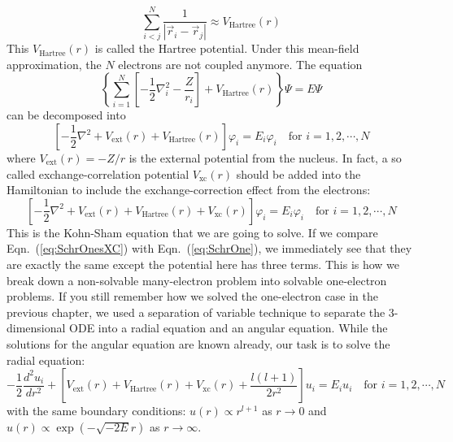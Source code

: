 \begin{equation} \label{eq:Hartree}
\sum_{i<j}^N \frac{1}{|\vec{r}_i - \vec{r}_j|} \approx  V_{\text{Hartree}}(r)
\end{equation}
%
This $V_{\text{Hartree}}(r)$ is called the Hartree potential. Under this mean-field
approximation, the $N$ electrons are not coupled anymore. The equation
\begin{equation} \label{eq:SchrDecp}
\left\{\sum_{i=1}^N \left[ -\frac{1}{2} \nabla_i^2 - \frac{Z}{r_i} \right] + V_{\text{Hartree}}(r)\right\} \Psi = E \Psi
\end{equation}
can be decomposed into
\begin{equation} \label{eq:SchrOnes}
\left[ -\frac{1}{2} \nabla^2 + V_{\text{ext}}(r) +  V_{\text{Hartree}}(r) \right] \varphi_i = E_i \varphi_i \quad \text{for } i = 1,2,\cdots,N
\end{equation}
where $V_{\text{ext}}(r) = -Z/r$ is the external potential from the nucleus.
In fact, a so called exchange-correlation potential $V_{\text{xc}}(r)$ should
be added into the Hamiltonian to include the exchange-correction effect \cite{ES}
from the electrons:
\begin{equation} \label{eq:SchrOnesXC}
\left[ -\frac{1}{2} \nabla^2 + V_{\text{ext}}(r) +  V_{\text{Hartree}}(r) + V_{\text{xc}}(r) \right] \varphi_i = E_i \varphi_i \quad \text{for } i = 1,2,\cdots,N
\end{equation}
%
This is the Kohn-Sham equation \cite{KS} that we are going to solve.
If we compare Eqn.~(\ref{eq:SchrOnesXC}) with Eqn.~(\ref{eq:SchrOne}), we
immediately see that they are exactly the same except the potential here has
three terms. This is how we break down a
non-solvable many-electron problem into solvable one-electron problems.
If you still remember how we solved the one-electron case in the previous chapter,
we used a separation of variable technique to separate the 3-dimensional ODE
into a radial equation and an angular equation. While the solutions for the angular
equation are known already, our task is to solve the radial equation:
\begin{equation} \label{eq:manyElec}
\boxed{-\frac{1}{2} \frac{d^2u_i}{dr^2} + \left[ V_{\text{ext}}(r) +  V_{\text{Hartree}}(r) + V_{\text{xc}}(r) + \frac{l(l+1)}{2r^2} \right] u_i = E_i u_i} \quad \text{for } i = 1,2,\cdots,N
\end{equation}
with the same boundary conditions: $u(r) \propto r^{l+1}$ as $r\rightarrow0$ and
$u(r) \propto \exp{(-\sqrt{-2E}r)}$ as $r\rightarrow\infty$.

